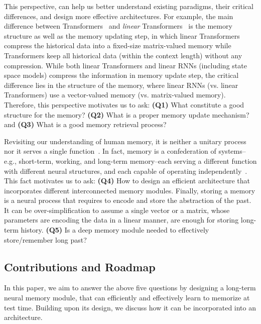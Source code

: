 \documentclass{article}
\newcommand{\citep}{\parencite}
\begin{document}
This perspective, can help us better understand existing paradigms, their critical differences, and design more effective architectures. For example, the main difference between Transformers~\citep{transformers} and \emph{linear} Transformers~\citep{katharopoulos2020transformers} is the memory structure as well as the memory updating step, in which linear Transformers compress the historical data into a fixed-size matrix-valued memory while Transformers keep all historical data (within the context length) without any compression. While both linear Transformers and linear RNNs (including state space models) compress the information in memory update step, the critical difference lies in the structure of the memory, where linear RNNs (vs. linear Transformers) use a vector-valued memory (vs. matrix-valued memory). Therefore, this perspective motivates us to ask: \textcolor{c3}{\textbf{(Q1)}} What constitute a good structure for the memory?
\textcolor{c3}{\textbf{(Q2)}} What is a proper memory update mechanism? and 
\textcolor{c3}{\textbf{(Q3)}} What is a good memory retrieval process?

Revisiting our understanding of human memory, it is neither a unitary process nor it serves a single function~\citep{cowan2008differences}. In fact, memory is a confederation of systems–e.g., short-term, working, and long-term memory–each serving a different function with different neural structures, and each capable of operating independently~\citep{willingham1997systems}. This fact motivates us to ask: \textcolor{c3}{\textbf{(Q4)}} How to design an efficient architecture that incorporates different interconnected memory modules. Finally, storing a memory is a neural process that requires to encode and store the abstraction of the past. It can be over-simplification to assume a single vector or a matrix, whose parameters are encoding the data in a linear manner, are enough for storing long-term history. \textcolor{c3}{\textbf{(Q5)}} Is a deep memory module needed to effectively store/remember long past?

\subsection*{\textcolor{c3}{Contributions and Roadmap}}
In this paper, we aim to answer the above five questions by designing a long-term neural memory module, that can efficiently and effectively learn to memorize at test time. Building upon its design, we discuss how it can be incorporated into an architecture.
\end{document}

